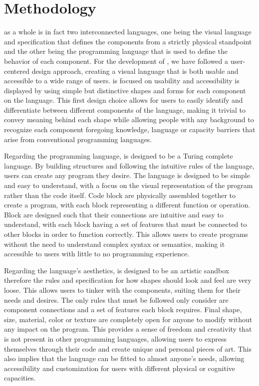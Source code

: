 \section{Methodology}
\label{sec:methodology}

\sculpt as a whole is in fact two interconnected languages, one being the visual language and specification that defines the components from a strictly physical standpoint and the other being the programming language that is used to define the behavior of each component.
For the development of \sculpt, we have followed a user-centered design approach, creating a visual language that is both usable and accessible to a wide range of users.
\sculpt is focused on usability and accessibility is displayed by using simple but distinctive shapes and forms for each component on the language.
This first design choice allows for users to easily identify and differentiate between different components of the language, making it trivial to convey meaning behind each shape while allowing people with any background to recognize each component foregoing knowledge, language or capacity barriers that arise from conventional programming languages.

Regarding the programming language, \sculpt is designed to be a Turing complete language. 
By building structures and following the intuitive rules of the language, users can create any program they desire. 
The language is designed to be simple and easy to understand, with a focus on the visual representation of the program rather than the code itself.
Code block are physically assembled together to create a program, with each block representing a different function or operation. Block are designed such that their connections are intuitive and easy to understand, with each block having a set of features that must be connected to other blocks in order to function correctly.
This allows users to create programs without the need to understand complex syntax or semantics, making it accessible to users with little to no programming experience.


Regarding the language's aesthetics, \sculpt is designed to be an artistic sandbox therefore the rules and specification for how shapes should look and feel are very loose. This allows users to tinker with the components, suiting them for their needs and desires.
The only rules that must be followed only consider are component connections and a set of features each block requires. Final shape, size, material, color or texture are completely open for anyone to modify without any impact on the program.
This provides a sense of freedom and creativity that is not present in other programming languages, allowing users to express themselves through their code and create unique and personal pieces of art.
This also implies that the language can be fitted to almost anyone's needs, allowing accessibility and customization for users with different physical or cognitive capacities.

